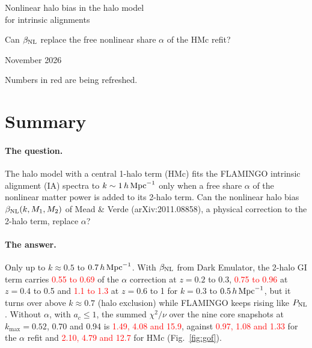 \documentclass[11pt]{article}
\newcommand{\hMpc}{\,h\,{\rm Mpc}^{-1}}
\newcommand{\PNL}{P_{\rm NL}}
\newcommand{\bNL}{\beta_{\rm NL}}
\newcommand{\kmax}{k_{\max}}
\newif\ifnumbersfinal
\newcommand{\refresh}[1]{\ifnumbersfinal#1\else\textcolor{red}{#1}\fi}
\newcommand{\GofAlpha}{\refresh{0.97, 1.08 and 1.33}}
\newcommand{\GofNlb}{\refresh{1.49, 4.08 and 15.9}}
\newcommand{\GofLin}{\refresh{2.10, 4.79 and 12.7}}
\newcommand{\ShareLowZ}{\refresh{0.55 to 0.69}}
\newcommand{\ShareMidZ}{\refresh{0.75 to 0.96}}
\newcommand{\ShareHighZ}{\refresh{1.1 to 1.3}}
\begin{document}
\begin{center}
  {\LARGE Nonlinear halo bias in the halo model\\[0.2em] for intrinsic alignments\par}
  \vspace{0.6em}
  {\large Can $\bNL$ replace the free nonlinear share $\alpha$ of the HMc refit?\par}
  \vspace{0.6em}
  {\large November 2026\par}
  \ifnumbersfinal\else
    \vspace{0.6em}
    {\color{red}Numbers in red are being refreshed.\par}
  \fi
\end{center}
\vspace{1em}

\section{Summary}
\label{sec:summary}

\paragraph{The question.}
The halo model with a central 1-halo term (HMc) fits the FLAMINGO intrinsic
alignment (IA) spectra to $k \sim 1\hMpc$ only when a free share $\alpha$ of
the nonlinear matter power is added to its 2-halo term. Can the nonlinear
halo bias $\bNL(k, M_1, M_2)$ of Mead \& Verde (arXiv:2011.08858), a
physical correction to the 2-halo term, replace $\alpha$?

\paragraph{The answer.}
Only up to $k \approx 0.5$ to $0.7\hMpc$. With $\bNL$ from Dark Emulator, the
2-halo GI term carries \ShareLowZ{} of the $\alpha$ correction at
$z = 0.2$ to 0.3, \ShareMidZ{} at $z = 0.4$ to 0.5 and \ShareHighZ{} at
$z = 0.6$ to 1 for $k = 0.3$ to $0.5\hMpc$, but it turns over above
$k \approx 0.7$ (halo exclusion) while FLAMINGO keeps rising like $\PNL$. Without $\alpha$, with $a_c \le 1$, the
summed $\chi^2/\nu$ over the nine core snapshots at $\kmax = 0.52$, 0.70 and
0.94 is \GofNlb{}, against \GofAlpha{} for the $\alpha$ refit and \GofLin{}
for HMc (Fig.~\ref{fig:gof}).
\end{document}
